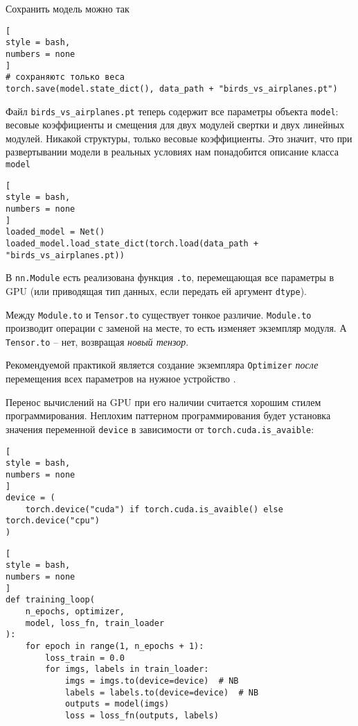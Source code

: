 \documentclass[%
	11pt,
	a4paper,
	utf8,
		]{article}
\begin{document}
Сохранить модель можно так
\begin{lstlisting}[
style = bash,
numbers = none
]
# сохраняютс только веса
torch.save(model.state_dict(), data_path + "birds_vs_airplanes.pt")
\end{lstlisting}

Файл \verb|birds_vs_airplanes.pt| теперь содержит все параметры объекта \verb|model|: весовые коэффициенты и смещения для двух модулей свертки и двух линейных модулей. Никакой структуры, только весовые коэффициенты. Это значит, что при развертывании модели в реальных условиях нам понадобится описание класса \verb|model|
\begin{lstlisting}[
style = bash,
numbers = none	
]
loaded_model = Net()
loaded_model.load_state_dict(torch.load(data_path + "birds_vs_airplanes.pt))
\end{lstlisting}

В \verb|nn.Module| есть реализована функция \verb|.to|, перемещающая все параметры в GPU (или приводящая тип данных, если передать ей аргумент \verb|dtype|). 

Между \verb|Module.to| и \verb|Tensor.to| существует тонкое различие. \verb|Module.to| производит операции с заменой на месте, то есть изменяет экземпляр модуля. А \verb|Tensor.to| -- нет, возвращая \emph{новый тензор}.

Рекомендуемой практикой является создание экземпляра \verb|Optimizer| \emph{после} перемещения всех параметров на нужное устройство \cite[]{pytorch-2022}.

Перенос вычислений на GPU при его наличии считается хорошим стилем программирования. Неплохим паттерном программирования будет установка значения переменной \verb|device| в зависимости от \verb|torch.cuda.is_avaible|:
\begin{lstlisting}[
style = bash,
numbers = none
]
device = (
    torch.device("cuda") if torch.cuda.is_avaible() else torch.device("cpu")
)
\end{lstlisting}

\begin{lstlisting}[
style = bash,
numbers = none
]
def training_loop(
    n_epochs, optimizer,
    model, loss_fn, train_loader
):
    for epoch in range(1, n_epochs + 1):
        loss_train = 0.0
        for imgs, labels in train_loader:
            imgs = imgs.to(device=device)  # NB
            labels = labels.to(device=device)  # NB
            outputs = model(imgs)
            loss = loss_fn(outputs, labels)
\end{lstlisting}
\end{document}
